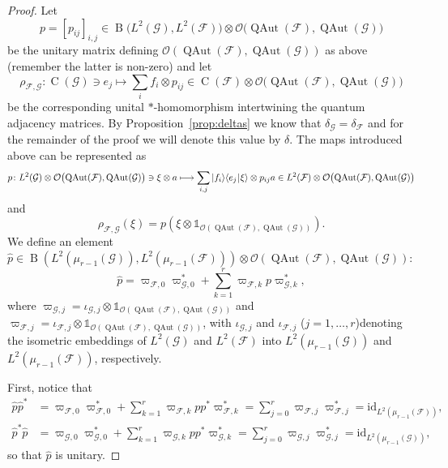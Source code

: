 \documentclass[10pt,a4paper]{amsart}
\DeclareMathOperator{\B}{B}
\DeclareMathOperator{\C}{C}
\DeclareMathOperator{\QAut}{QAut}
\newcommand{\I}{\mathds{1}}
\newcommand{\id}{\mathrm{id}}
\newcommand{\is}[2]{{\left\langle{#1}\,\vline\,#2\right\rangle}}
\newcommand{\ket}[1]{{\left|#1\right\rangle}}
\newcommand{\tens}{\otimes}
\begin{document}
\begin{proof}
Let
\[
p=[p_{ij}]_{i,j}\in\B\bigl(L^2(\mathcal{G}),L^2(\mathcal{F})\bigr)\tens\mathcal{O}\bigl(\QAut(\mathcal{F}),\QAut(\mathcal{G})\bigr)
\]
be the unitary matrix defining $\mathcal{O}(\QAut(\mathcal{F}),\QAut(\mathcal{G}))$ as above (remember the latter is non-zero) and let
\[
\rho_{\scriptscriptstyle\mathcal{F},\mathcal{G}}\colon\C(\mathcal{G})\ni e_j\longmapsto\sum\limits_i f_i\tens p_{ij}\in\C(\mathcal{F})\tens\mathcal{O}\bigl(\QAut(\mathcal{F}),\QAut(\mathcal{G})\bigr)
\]
be the corresponding unital $*$-homomorphism intertwining the quantum adjacency matrices. By Proposition~\ref{prop:deltas} we know that $\delta_{\scriptscriptstyle\mathcal{G}}=\delta_{\scriptscriptstyle\mathcal{F}}$ and for the remainder of the proof we will denote this value by $\delta$. The maps introduced above can be represented as
\[
p\colon L^2(\mathcal{G})\tens\mathcal{O}\bigl(\QAut(\mathcal{F}),\QAut(\mathcal{G})\bigr)\ni\xi\tens a\longmapsto\sum\limits_{i,j}\ket{f_i}\is{e_j}{\xi}\tens p_{ij}a\in L^2(\mathcal{F})\tens\mathcal{O}\bigl(\QAut(\mathcal{F}),\QAut(\mathcal{G})\bigr)
\]
and
\[
\rho_{\scriptscriptstyle\mathcal{F},\mathcal{G}}(\xi)=p(\xi\tens \I_{\mathcal{O}(\QAut(\mathcal{F}),\QAut(\mathcal{G}))}).
\]
We define an element $\widehat{p}\in\B(L^2(\mu_{r-1}(\mathcal{G})),L^2(\mu_{r-1}(\mathcal{F})))\tens\mathcal{O}(\QAut(\mathcal{F}),\QAut(\mathcal{G}))$:
\[
\widehat{p}=\varpi_{\scriptscriptstyle\mathcal{F},0}\varpi_{\scriptscriptstyle\mathcal{G},0}^*+\sum\limits_{k=1}^r\varpi_{\scriptscriptstyle\mathcal{F},k} p\varpi_{\scriptscriptstyle\mathcal{G},k}^*,
\]
where $\varpi_{\scriptscriptstyle\mathcal{G},j}=\iota_{\scriptscriptstyle\mathcal{G},j}\tens\I_{\mathcal{O}(\QAut(\mathcal{F}),\QAut(\mathcal{G}))}$ and $\varpi_{\scriptscriptstyle\mathcal{F},j}=\iota_{\scriptscriptstyle\mathcal{F},j}\tens\I_{\mathcal{O}(\QAut(\mathcal{F}),\QAut(\mathcal{G}))}$, with $\iota_{\scriptscriptstyle\mathcal{G},j}$ and $\iota_{\scriptscriptstyle\mathcal{F},j}$ ($j=1,\ldots,r$)denoting the isometric embeddings of $L^2(\mathcal{G})$ and $L^2(\mathcal{F})$ into $L^2(\mu_{r-1}(\mathcal{G}))$ and $L^2(\mu_{r-1}(\mathcal{F}))$, respectively.

First, notice that
\[
\begin{aligned}
\widehat{p}\widehat{p}^*&=\varpi_{\scriptscriptstyle\mathcal{F},0}\varpi_{\scriptscriptstyle\mathcal{F},0}^* +\sum\limits_{k=1}^r\varpi_{\scriptscriptstyle\mathcal{F},k} pp^*\varpi_{\scriptscriptstyle\mathcal{F},k}^* =\sum\limits_{j=0}^r\varpi_{\scriptscriptstyle\mathcal{F},j}\varpi_{\scriptscriptstyle\mathcal{F},j}^*=\id_{L^2(\mu_{r-1}(\mathcal{F}))},\\
\widehat{p}^*\widehat{p}&=\varpi_{\scriptscriptstyle\mathcal{G},0}\varpi_{\scriptscriptstyle\mathcal{G},0}^* +\sum\limits_{k=1}^r\varpi_{\scriptscriptstyle\mathcal{G},k} pp^*\varpi_{\scriptscriptstyle\mathcal{G},k}^* =\sum\limits_{j=0}^r\varpi_{\scriptscriptstyle\mathcal{G},j}\varpi_{\scriptscriptstyle\mathcal{G},j}^*=\id_{L^2(\mu_{r-1}(\mathcal{G}))},
\end{aligned}
\]
so that $\widehat{p}$ is unitary.


\end{proof}
\end{document}

